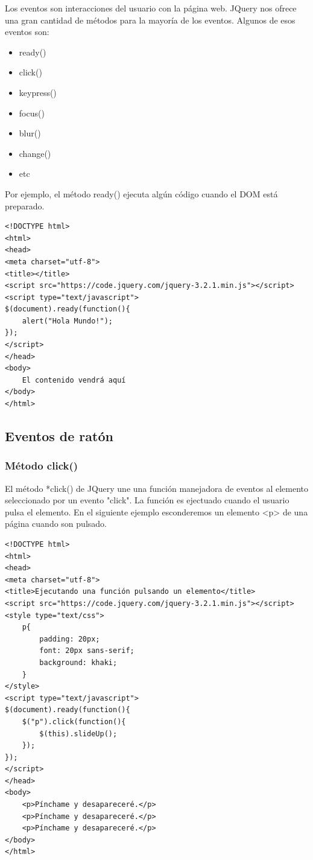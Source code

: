 \documentclass[a4paper, oneside]{article}
\begin{document}
Los eventos son interacciones del usuario con la página web. JQuery nos ofrece una gran cantidad de métodos para la mayoría de los eventos. Algunos de esos eventos son:

\begin{itemize}
\item ready()
\item click()
\item keypress()
\item focus()
\item blur()
\item change()
\item etc
\end{itemize}

Por ejemplo, el método ready() ejecuta algún código cuando el DOM está preparado.

\begin{verbatim}
<!DOCTYPE html>
<html>
<head>
<meta charset="utf-8">
<title></title>
<script src="https://code.jquery.com/jquery-3.2.1.min.js"></script>
<script type="text/javascript">
$(document).ready(function(){
    alert("Hola Mundo!");
});
</script> 
</head>
<body>
    El contenido vendrá aquí
</body>
</html>         
\end{verbatim}

\subsection{Eventos de ratón}
\label{sec:org818d3bf}

\subsubsection{Método click()}
\label{sec:orgae5816b}

El método *click() de JQuery une una función manejadora de eventos al elemento seleccionado por un evento "click". La función es ejectuado cuando el usuario pulsa el elemento. En el siguiente ejemplo esconderemos un elemento <p> de una página cuando son pulsado.

\begin{verbatim}
<!DOCTYPE html>
<html>
<head>
<meta charset="utf-8">
<title>Ejecutando una función pulsando un elemento</title>
<script src="https://code.jquery.com/jquery-3.2.1.min.js"></script>
<style type="text/css">
    p{
        padding: 20px;
        font: 20px sans-serif;
        background: khaki;
    }
</style>
<script type="text/javascript">
$(document).ready(function(){
    $("p").click(function(){
        $(this).slideUp();
    });
});
</script>
</head>
<body>
    <p>Pínchame y desapareceré.</p>
    <p>Pínchame y desapareceré.</p>
    <p>Pínchame y desapareceré.</p>
</body>
</html>                                		
\end{verbatim}
\end{document}

